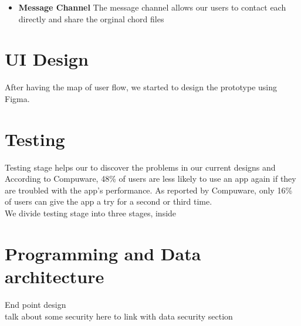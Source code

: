 \begin{itemize}
\item \textbf{Message Channel}
The message channel allows our users to contact each directly and share the orginal chord files 

\end{itemize}




\section{UI Design}
After having the map of user flow, we started to design the prototype using Figma.


\section{Testing}
Testing stage helps our to discover the problems in our current designs and 
According to Compuware, 48\% of users are less likely to use an app again if they are troubled with the app’s performance.
As reported by Compuware, only 16\% of users can give the app a try for a second or third time.  \\

We divide testing stage into three stages, inside 

\section{Programming and Data architecture}
End point design
\\talk about some security here to link with data security section






